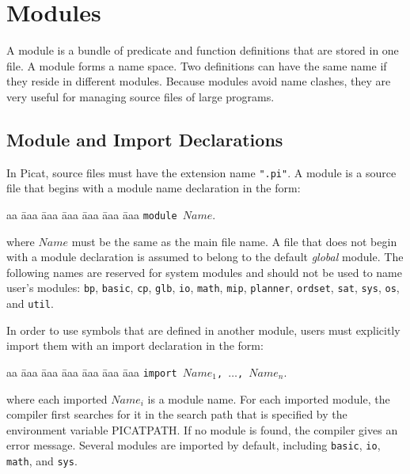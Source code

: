 \chapter{Modules}
A module is a bundle of predicate and function definitions that are stored in one file. A module forms a name space.  Two definitions can have the same name if they reside in different modules. Because modules avoid name clashes, they are very useful for managing source files of large programs.

\section{Module and Import Declarations}
In Picat, source files must have the extension name \texttt{".pi"}.  A module is a source file that begins with a module name declaration in the form:
\begin{tabbing}
aa \= aaa \= aaa \= aaa \= aaa \= aaa \= aaa \kill
\> \texttt{module $Name$}.
\end{tabbing}
where $Name$ must be the same as the main file name. A file that does not begin with a module declaration is assumed to belong to the default \emph{global} module. The following names are reserved for system modules and should not be used to name user's modules: \texttt{bp}, \texttt{basic}, \texttt{cp}, \texttt{glb},  \texttt{io}, \texttt{math}, \texttt{mip}, \texttt{planner}, \texttt{ordset}, \texttt{sat}, \texttt{sys},  \texttt{os}, and \texttt{util}.

In order to use symbols that are defined in another module, users must explicitly import them with an import declaration in the form:
\begin{tabbing}
aa \= aaa \= aaa \= aaa \= aaa \= aaa \= aaa \kill
\> \texttt{import $Name_1$, $\ldots$, $Name_n$}.
\end{tabbing}
where each imported $Name_i$ is a module name. For each imported module, the compiler first searches for it in the search path that is specified by the environment variable PICATPATH. If no module is found, the compiler gives an error message. Several modules are imported by default, including  \texttt{basic}, \texttt{io}, \texttt{math},  and \texttt{sys}.

